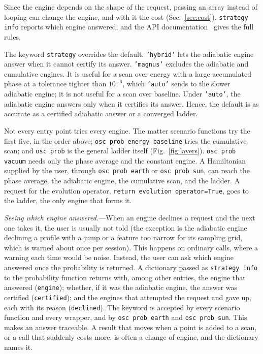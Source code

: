 \documentclass[final,5p,times,twocolumn,sort,compress]{elsarticle}
\makeatletter
\DeclareRobustCommand{\_}{%
  \ifmmode\nfss@text{\textunderscore}\else\textunderscore\allowbreak\fi}
\makeatother
\begin{document}
Since the engine depends on the shape of the request, passing an array instead of looping can change the engine, and with it the cost (Sec.~\ref{sec:cost}). {\tt strategy\_info} reports which engine answered, and the API documentation~\cite{MagnusDocs} gives the full rules.

The keyword {\tt strategy} overrides the default. {\tt 'hybrid'} lets the adiabatic engine answer when it cannot certify its answer. {\tt 'magnus'} excludes the adiabatic and cumulative engines. It is useful for a scan over energy with a large accumulated phase at a tolerance tighter than $10^{-6}$, which {\tt 'auto'} sends to the slower adiabatic engine; it is not useful for a scan over baseline. Under {\tt 'auto'}, the adiabatic engine answers only when it certifies its answer. Hence, the default is as accurate as a certified adiabatic answer or a converged ladder.

Not every entry point tries every engine. The matter scenario functions try the first five, in the order above; {\tt osc\_prob\_energy\_baseline} tries the cumulative scan; and {\tt osc\_prob} is the general ladder itself (Fig.~\ref{fig:layers}). {\tt osc\_prob\_vacuum} needs only the phase average and the constant engine. A Hamiltonian supplied by the user, through {\tt osc\_prob\_earth} or {\tt osc\_prob\_sun}, can reach the phase average, the adiabatic engine, the cumulative scan, and the ladder. A request for the evolution operator, {\tt return\_evolution\_operator=True}, goes to the ladder, the only engine that forms it.

\smallskip

\textit{Seeing which engine answered.}---When an engine declines a request and the next one takes it, the user is usually not told (the exception is the adiabatic engine declining a profile with a jump or a feature too narrow for its sampling grid, which is warned about once per session). This happens on ordinary calls, where a warning each time would be noise. Instead, the user can ask which engine answered once the probability is returned. A dictionary passed as {\tt strategy\_info} to the probability function returns with, among other entries, the engine that answered ({\tt engine}); whether, if it was the adiabatic engine, the answer was certified ({\tt certified}); and the engines that attempted the request and gave up, each with its reason ({\tt declined}). The keyword is accepted by every scenario function and every wrapper, and by {\tt osc\_prob\_earth} and {\tt osc\_prob\_sun}. This makes an answer traceable. A result that moves when a point is added to a scan, or a call that suddenly costs more, is often a change of engine, and the dictionary names it.
\end{document}
